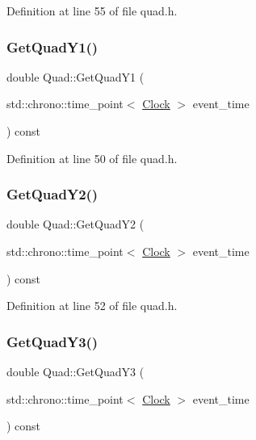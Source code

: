 Definition at line 55 of file quad.\+h.

\mbox{\label{class_quad_ac7b0d27994149531dcd81eacca4e1a5c}} 
\subsubsection{\texorpdfstring{Get\+Quad\+Y1()}{GetQuadY1()}}
{\footnotesize\ttfamily double Quad\+::\+Get\+Quad\+Y1 (\begin{DoxyParamCaption}\item[{std\+::chrono\+::time\+\_\+point$<$ \mbox{\hyperlink{universe_8h_a0ef8d951d1ca5ab3cfaf7ab4c7a6fd80}{Clock}} $>$}]{event\+\_\+time }\end{DoxyParamCaption}) const\hspace{0.3cm}{\ttfamily [inline]}}



Definition at line 50 of file quad.\+h.

\mbox{\label{class_quad_a8f10730993f6c6310f18431a81fb352a}} 
\subsubsection{\texorpdfstring{Get\+Quad\+Y2()}{GetQuadY2()}}
{\footnotesize\ttfamily double Quad\+::\+Get\+Quad\+Y2 (\begin{DoxyParamCaption}\item[{std\+::chrono\+::time\+\_\+point$<$ \mbox{\hyperlink{universe_8h_a0ef8d951d1ca5ab3cfaf7ab4c7a6fd80}{Clock}} $>$}]{event\+\_\+time }\end{DoxyParamCaption}) const\hspace{0.3cm}{\ttfamily [inline]}}



Definition at line 52 of file quad.\+h.

\mbox{\label{class_quad_a9cdb9ea12e3aa3eb0e471015d4cb46bb}} 
\subsubsection{\texorpdfstring{Get\+Quad\+Y3()}{GetQuadY3()}}
{\footnotesize\ttfamily double Quad\+::\+Get\+Quad\+Y3 (\begin{DoxyParamCaption}\item[{std\+::chrono\+::time\+\_\+point$<$ \mbox{\hyperlink{universe_8h_a0ef8d951d1ca5ab3cfaf7ab4c7a6fd80}{Clock}} $>$}]{event\+\_\+time }\end{DoxyParamCaption}) const\hspace{0.3cm}{\ttfamily [inline]}}



